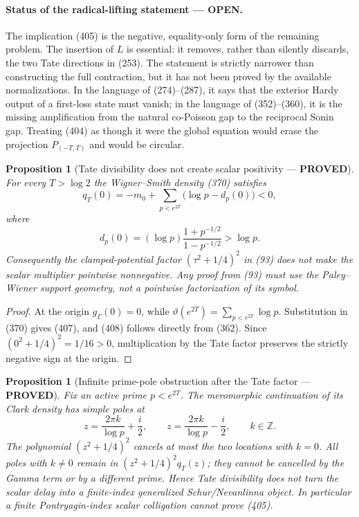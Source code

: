 \documentclass[11pt]{article}
\newtheorem{proposition}[theorem]{Proposition}
\newcommand{\PROVED}{\textcolor{green!45!black}{\textbf{PROVED}}}
\newcommand{\OPEN}{\textcolor{red!70!black}{\textbf{OPEN}}}
\begin{document}
\paragraph{Status of the radical-lifting statement --- \OPEN.}
The implication (405) is the negative, equality-only form of the remaining
problem.  The insertion of $L$ is essential: it removes, rather than
silently discards, the two Tate directions in (253).  The statement is
strictly narrower than constructing the full contraction,
but it has not been proved by the available normalizations.  In the language
of (274)--(287), it says that the exterior Hardy output of a first-loss state
must vanish; in the language of (352)--(360), it is the missing amplification
from the natural co-Poisson gap to the reciprocal Sonin gap.  Treating (404)
as though it were the global equation would erase the projection
$P_{(-T,T)}$ and would be circular.

\begin{proposition}[Tate divisibility does not create scalar positivity ---
\PROVED]
For every $T>\log2$ the Wigner--Smith density (370) satisfies
\begin{equation}
 q_T(0)=-m_0+
 \sum_{p<e^{2T}}\bigl(\log p-d_p(0)\bigr)<0,          \tag{407}
\end{equation}
where
\begin{equation}
 d_p(0)=(\log p)\frac{1+p^{-1/2}}{1-p^{-1/2}}
       >\log p.                                      \tag{408}
\end{equation}
Consequently the clamped-potential factor
$(\tau^2+1/4)^2$ in (93) does not make the scalar multiplier pointwise
nonnegative.  Any proof from (93) must use the Paley--Wiener support geometry,
not a pointwise factorization of its symbol.
\end{proposition}

\begin{proof}
At the origin $g_\Gamma(0)=0$, while
$\vartheta(e^{2T})=\sum_{p<e^{2T}}\log p$.  Substitution in (370) gives
(407), and (408) follows directly from (362).  Since
$(0^2+1/4)^2=1/16>0$, multiplication by the Tate factor preserves the
strictly negative sign at the origin.
\end{proof}

\begin{proposition}[Infinite prime-pole obstruction after the Tate factor ---
\PROVED]
Fix an active prime $p<e^{2T}$.  The meromorphic continuation of its Clark
density has simple poles at
\begin{equation}
 z=\frac{2\pi k}{\log p}+\frac i2,
 \qquad
 z=\frac{2\pi k}{\log p}-\frac i2,
 \qquad k\in\mathbb Z.                              \tag{409}
\end{equation}
The polynomial $(z^2+1/4)^2$ cancels at most the two locations with $k=0$.
All poles with $k\ne0$ remain in
$(z^2+1/4)^2q_T(z)$; they cannot be cancelled by the Gamma term or by a
different prime.  Hence Tate divisibility does not turn the scalar delay
into a finite-index generalized Schur/Nevanlinna object.  In particular a
finite Pontryagin-index scalar colligation cannot prove (405).
\end{proposition}
\end{document}
